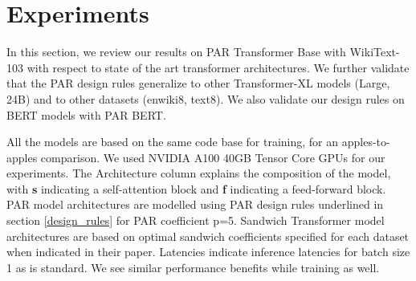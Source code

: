 \documentclass[11pt]{article}
\begin{document}
\begin{table*}[]
    \centering
    {}
    \captionsetup{justification=centering}
    \caption{Experimental results of PAR BERT in comparison to BERT Base and DistilBERT. 
    \hspace{\textwidth}F1 score for SQuAD v1.1 and accuracy for SST-2 and MRPC reported from a median of 5 runs on dev sets.
    \hspace{\textwidth}Reported Latency for SQuAD inference.
    \hspace{\textwidth} * indicates originally published results.
    \hspace{\textwidth} + indicates estimated latency as 61\% of Bert Base based on DistilBERT paper}
    \label{table:bert_results}
\end{table*}

\section{Experiments}

In this section, we review our results on PAR Transformer Base with WikiText-103 with respect to state of the art transformer architectures. We further validate that the PAR design rules generalize to other Transformer-XL models (Large, 24B) and to other datasets (enwiki8, text8). We also validate our design rules on BERT models with PAR BERT. 

All the models are based on the same code base for training, for an apples-to-apples comparison. We used NVIDIA A100 40GB Tensor Core GPUs for our experiments. The Architecture column explains the composition of the model, with \textbf{s} indicating a self-attention block and \textbf{f} indicating a feed-forward block. PAR model architectures are modelled using PAR design rules underlined in section \ref{design_rules} for PAR coefficient p=5. Sandwich Transformer model architectures are based on optimal sandwich coefficients specified for each dataset when indicated in their paper. Latencies indicate inference latencies for batch size 1 as is standard. We see similar performance benefits while training as well.
\end{document}
